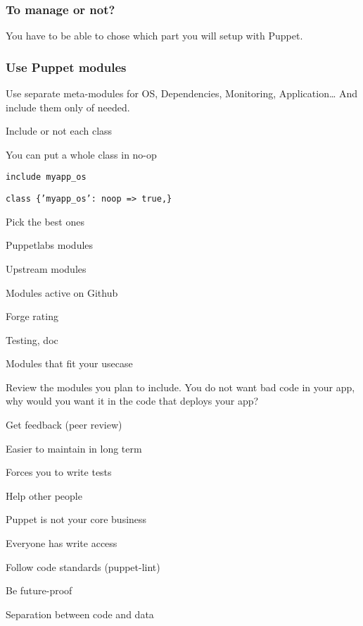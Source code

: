 \begin{frame}
    \frametitle{To manage or not?}
    \huge You have to be able to chose which part you will setup with Puppet.
\end{frame}
\begin{frame}
    \frametitle{Use Puppet modules}
    \huge Use separate meta-modules for OS, Dependencies, Monitoring, Application\dots{} And include them only of needed.
\end{frame}

\begin{iframe}
\item Include or not each class
\item You can put a whole class in no-op
\item{\texttt{include myapp\_os}}
\item{\texttt{class \{'myapp\_os': noop => true,\}}}
\end{iframe}


\begin{iframe}
\item Pick the best ones
\item Puppetlabs modules
\item Upstream modules
\item Modules active on Github
\item Forge rating
\item Testing, doc
\item Modules that fit your usecase
\end{iframe}

\begin{frame}\LARGE Review the modules you plan to include. You do not want bad code in your app, why would you want it in the code that deploys your app?\end{frame}

\begin{iframe}
\item Get feedback (peer review)
\item Easier to maintain in long term
\item Forces you to write tests
\item Help other people
\item Puppet is not your core business
\end{iframe}


\begin{iframe}
\item Everyone has write access
\item Follow code standards (puppet-lint)
\item Be future-proof
\item Separation between code and data
\end{iframe}

